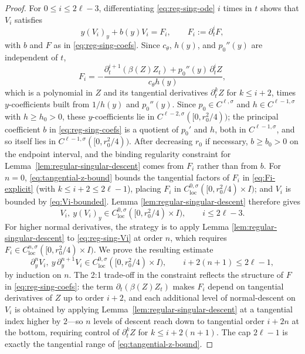 \documentclass[11pt]{amsart}
\newcommand{\loc}{\mathrm{loc}}
\begin{document}
\begin{proof}
For \(0\le i\le2\ell-3\), differentiating \eqref{eq:reg-sing-ode} \(i\)
times in \(t\) shows that \(V_i\) satisfies
\begin{equation}
\label{eq:reg-sing-Vi}
        y(V_i)_y+b(y)V_i=F_i,
        \qquad F_i:=\partial_t^iF,
\end{equation}
with \(b\) and \(F\) as in \eqref{eq:reg-sing-coefs}. Since
\(c_\theta\), \(h(y)\), and \(p_0''(y)\) are independent of \(t\),
\begin{equation}
\label{eq:Fi-explicit}
        F_i=-\frac{\partial_t^{i+1}(\beta(Z)Z_t)
        +p_0''(y)\,\partial_t^iZ}{c_\theta h(y)} ,
\end{equation}
which is a polynomial in \(Z\) and its tangential derivatives
\(\partial_t^kZ\) for \(k\le i+2\), times \(y\)-coefficients built from
\(1/h(y)\) and \(p_0''(y)\). Since \(p_0\in C^{\ell,\sigma}\) and
\(h\in C^{\ell-1,\sigma}\) with \(h\ge h_0>0\), these \(y\)-coefficients
lie in \(C^{\ell-2,\sigma}([0,r_0^2/4))\); the principal coefficient
\(b\) in \eqref{eq:reg-sing-coefs} is a quotient of \(p_0'\) and \(h\), both
in \(C^{\ell-1,\sigma}\), and so itself lies in
\(C^{\ell-1,\sigma}([0,r_0^2/4))\). After decreasing \(r_0\) if
necessary, \(b\ge b_0>0\) on the endpoint interval, and the binding
regularity constraint for
Lemma~\ref{lem:regular-singular-descent} comes from \(F_i\) rather than
from \(b\).
For \(n=0\), \eqref{eq:tangential-z-bound} bounds the tangential factors
of \(F_i\) in \eqref{eq:Fi-explicit} (with \(k\le i+2\le2\ell-1\)),
placing \(F_i\) in \(C^{0,\sigma}_{\loc}([0,r_0^2/4)\times I)\); and
\(V_i\) is bounded by \eqref{eq:Vi-bounded}. Lemma
\ref{lem:regular-singular-descent} therefore gives
\begin{equation}
\label{eq:Vi-base}
        V_i,\ y(V_i)_y\in C^{0,\sigma}_{\loc}([0,r_0^2/4)\times I),
        \qquad i\le2\ell-3 .
\end{equation}
For higher normal derivatives, the strategy is to apply Lemma
\ref{lem:regular-singular-descent} to \eqref{eq:reg-sing-Vi} at order
\(n\), which requires \(F_i\in C^{n,\sigma}_{\loc}([0,r_0^2/4)\times I)\).
We prove the resulting estimate
\begin{equation}
\label{eq:Vi-n-form}
        \partial_y^nV_i,\ y\,\partial_y^{n+1}V_i
        \in C^{0,\sigma}_{\loc}([0,r_0^2/4)\times I),
        \qquad i+2(n+1)\le2\ell-1,
\end{equation}
by induction on \(n\). The 2:1 trade-off in the constraint reflects the
structure of \(F\) in \eqref{eq:reg-sing-coefs}: the term
\(\partial_t(\beta(Z)Z_t)\) makes \(F_i\) depend on tangential derivatives
of \(Z\) up to order \(i+2\), and each additional level of normal-descent
on \(V_i\) is obtained by applying
Lemma~\ref{lem:regular-singular-descent} at a tangential index higher by
\(2\)---so \(n\) levels of descent reach down to tangential order
\(i+2n\) at the bottom, requiring control of \(\partial_t^kZ\) for
\(k\le i+2(n+1)\). The cap \(2\ell-1\) is exactly the
tangential range of \eqref{eq:tangential-z-bound}.


\end{proof}
\end{document}
